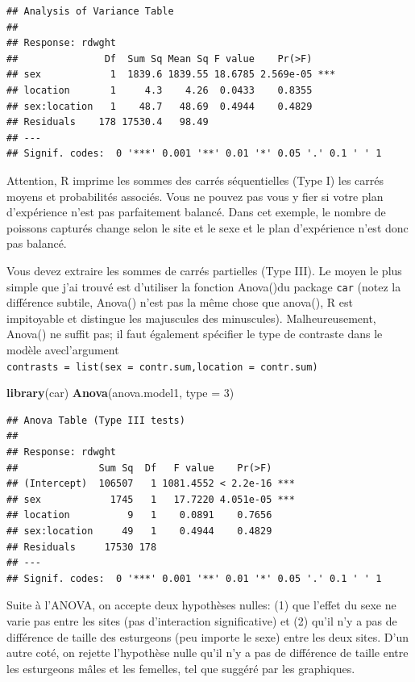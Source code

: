 \documentclass[12pt,]{book}
\makeatletter
\newenvironment{Shaded}{\begin{snugshade}}{\end{snugshade}}
\newcommand{\DataTypeTok}[1]{\textcolor[rgb]{0.13,0.29,0.53}{#1}}
\newcommand{\DecValTok}[1]{\textcolor[rgb]{0.00,0.00,0.81}{#1}}
\newcommand{\KeywordTok}[1]{\textcolor[rgb]{0.13,0.29,0.53}{\textbf{#1}}}
\newcommand{\NormalTok}[1]{#1}
\newenvironment{kframe}{%
\medskip{}
\setlength{\fboxsep}{.8em}
\def\at@end@of@kframe{}%
\ifinner\ifhmode%
 \def\at@end@of@kframe{\end{minipage}}%
 \begin{minipage}{\columnwidth}%
\fi\fi%
\def\FrameCommand##1{\hskip\@totalleftmargin \hskip-\fboxsep
\colorbox{incolor}{##1}\hskip-\fboxsep
    \hskip-\linewidth \hskip-\@totalleftmargin \hskip\columnwidth}%
\MakeFramed {\advance\hsize-\width
  \@totalleftmargin\z@ \linewidth\hsize
  \@setminipage}}%
{\par\unskip\endMakeFramed%
\at@end@of@kframe}
\newenvironment{rmdblock}[1]
 {
 \begin{itemize}
 \renewcommand{\labelitemi}{
   \raisebox{-.7\height}[0pt][0pt]{
     {\setkeys{Gin}{width=3em,keepaspectratio}\texttt{[image: images/\#1]}}
   }
 }
 \begin{kframe}
 \setlength{\fboxsep}{1em}
 \item
 }
 {
 \end{kframe}
 \end{itemize}
 }
\newenvironment{rmdwarning}
  {\begin{rmdblock}{warning}}
  {\end{rmdblock}}
\makeatother
\begin{document}
\begin{verbatim}
## Analysis of Variance Table
## 
## Response: rdwght
##               Df  Sum Sq Mean Sq F value    Pr(>F)    
## sex            1  1839.6 1839.55 18.6785 2.569e-05 ***
## location       1     4.3    4.26  0.0433    0.8355    
## sex:location   1    48.7   48.69  0.4944    0.4829    
## Residuals    178 17530.4   98.49                      
## ---
## Signif. codes:  0 '***' 0.001 '**' 0.01 '*' 0.05 '.' 0.1 ' ' 1
\end{verbatim}

\begin{rmdwarning}
Attention, R imprime les sommes des carrés séquentielles (Type I) les carrés moyens et probabilités associés. Vous ne pouvez pas vous y fier si votre plan d'expérience n'est pas parfaitement balancé. Dans cet exemple, le nombre de poissons capturés change selon le site et le sexe et le plan d'expérience n'est donc pas balancé.
\end{rmdwarning}

Vous devez extraire les sommes de carrés partielles (Type III). Le moyen le plus simple que j'ai trouvé est d'utiliser la fonction Anova()du package \texttt{car} (notez la différence subtile, Anova() n'est pas la même chose que anova(), R est impitoyable et distingue les majuscules des minuscules). Malheureusement, Anova() ne suffit pas; il faut également spécifier le type de contraste dans le modèle avecl'argument \texttt{contrasts\ =\ list(sex\ =\ contr.sum,location\ =\ contr.sum)}

\begin{Shaded}
\begin{Highlighting}[]
\KeywordTok{library}\NormalTok{(car)}
\KeywordTok{Anova}\NormalTok{(anova.model1, }\DataTypeTok{type =} \DecValTok{3}\NormalTok{)}
\end{Highlighting}
\end{Shaded}

\begin{verbatim}
## Anova Table (Type III tests)
## 
## Response: rdwght
##              Sum Sq  Df   F value    Pr(>F)    
## (Intercept)  106507   1 1081.4552 < 2.2e-16 ***
## sex            1745   1   17.7220 4.051e-05 ***
## location          9   1    0.0891    0.7656    
## sex:location     49   1    0.4944    0.4829    
## Residuals     17530 178                        
## ---
## Signif. codes:  0 '***' 0.001 '**' 0.01 '*' 0.05 '.' 0.1 ' ' 1
\end{verbatim}

Suite à l'ANOVA, on accepte deux hypothèses nulles: (1) que l'effet du sexe ne varie pas entre les sites (pas d'interaction significative) et (2) qu'il n'y a pas de différence de taille des esturgeons (peu importe le sexe) entre les deux sites. D'un autre coté, on rejette l'hypothèse nulle qu'il n'y a pas de différence de taille entre les esturgeons mâles et les femelles, tel que suggéré par les graphiques.
\end{document}
